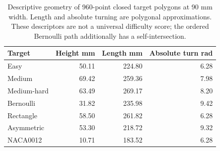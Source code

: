 \begin{table}[H]
\caption{Descriptive geometry of 960-point closed target polygons at 90 mm width. Length and absolute turning are polygonal approximations. These descriptors are not a universal difficulty score; the ordered Bernoulli path additionally has a self-intersection.}
\label{tab:v2_descriptors}
\centering
\small
\begin{tabular}{@{}lrrr@{}}
\toprule
Target & Height mm & Length mm & Absolute turn rad \\
\midrule
Easy & 50.11 & 224.80 & 6.28 \\
Medium & 69.42 & 259.36 & 7.98 \\
Medium-hard & 63.49 & 269.17 & 8.20 \\
Bernoulli & 31.82 & 235.98 & 9.42 \\
Rectangle & 58.50 & 261.82 & 6.28 \\
Asymmetric & 53.30 & 218.72 & 9.32 \\
NACA0012 & 10.71 & 183.52 & 6.28 \\
\bottomrule
\end{tabular}
\end{table}
